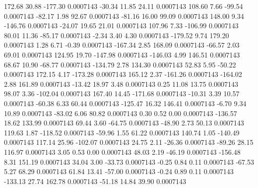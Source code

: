       172.68       30.88     -177.30     0.0007143
      -30.34       11.85       24.11     0.0007143
      108.60        7.66      -99.54     0.0007143
      -82.17        1.98       92.67     0.0007143
      -81.16       16.00       99.09     0.0007143
      148.00        9.34     -146.76     0.0007143
      -24.07       19.65       21.01     0.0007143
      107.96        7.33     -106.99     0.0007143
       80.01       11.36      -85.17     0.0007143
       -2.34        3.40        4.30     0.0007143
     -179.52        9.74      179.20     0.0007143
        1.28        6.71       -0.39     0.0007143
     -167.34        2.85      168.09     0.0007143
      -66.57        2.03       69.01     0.0007143
      124.95       19.70     -147.98     0.0007143
     -146.03        4.99      146.51     0.0007143
       68.67       10.90      -68.77     0.0007143
     -134.79        2.78      134.30     0.0007143
       52.83        5.95      -50.22     0.0007143
      172.15        4.17     -173.28     0.0007143
      165.12        2.37     -161.26     0.0007143
     -164.02        2.88      161.89     0.0007143
      -13.42       18.97        3.48     0.0007143
        0.25       11.08       13.75     0.0007143
       98.07        3.36     -102.04     0.0007143
      167.40       14.45     -171.68     0.0007143
      -10.31        3.39       10.57     0.0007143
      -60.38        6.33       60.44     0.0007143
     -125.47       16.32      146.41     0.0007143
       -6.70        9.34       10.89     0.0007143
      -83.02        6.06       80.82     0.0007143
        0.30        0.52        0.00     0.0007143
     -136.57       18.62      133.99     0.0007143
       69.44        3.60      -64.75     0.0007143
      -48.90        2.73       50.13     0.0007143
      119.63        1.87     -118.52     0.0007143
      -59.96        1.55       61.22     0.0007143
      140.74        1.05     -140.49     0.0007143
      117.14       25.96     -102.07     0.0007143
       24.75        2.11      -26.36     0.0007143
      -89.26       28.15      116.97     0.0007143
        3.05        0.53        0.00     0.0007143
       48.03        2.19      -46.19     0.0007143
     -156.48        8.31      151.19     0.0007143
       34.04        3.00      -33.73     0.0007143
       -0.25        0.84        0.11     0.0007143
      -67.53        5.27       68.29     0.0007143
       61.84       13.41      -57.00     0.0007143
       -0.24        0.89        0.11     0.0007143
     -133.13       27.74      162.78     0.0007143
      -51.18       14.84       39.90     0.0007143
